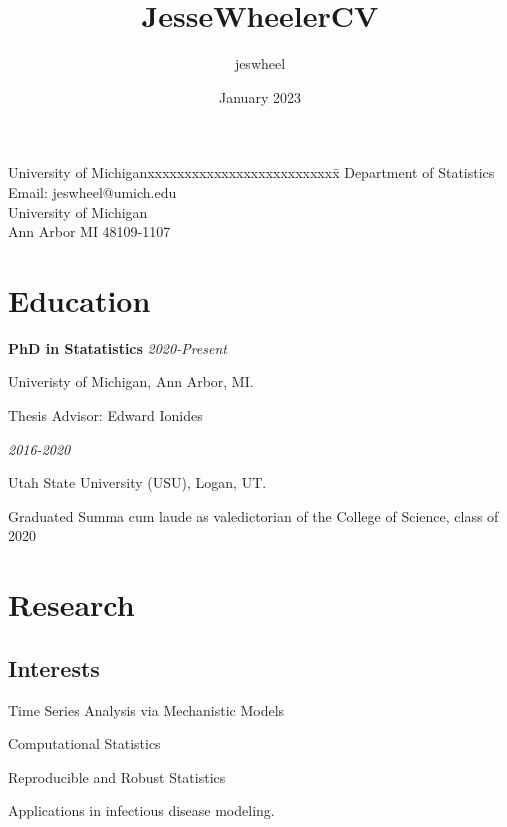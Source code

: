 \documentclass[11pt] {article}
\title{JesseWheelerCV}
\author{jeswheel }
\date{January 2023}
\newenvironment {interests}
                {
                 \begin{list}{}
                 {\setlength{\labelwidth}{0mm}
                  \setlength{\leftmargin}{8mm}
                  \setlength{\itemindent}{-3mm}
                  \setlength{\labelsep}{0mm}
                  \setlength{\parsep}{0.1 ex}
                  \setlength{\itemsep}{1pt}
      \setlength{\topsep}{0.15cm}}} %
   {\end{list}}
\begin{document}
\thispagestyle{empty}  %

\rule{0mm}{1mm}
\vspace{-20mm}


\vspace{1mm}

\rule{0mm}{1mm}


\begin{tabbing}
University of Michiganxxxxxxxxxxxxxxxxxxxxxxxxxx\= \kill
Department of Statistics \>  %
Email: {jeswheel@umich.edu}
\\
University of Michigan\> %
{}
\\
Ann Arbor MI 48109-1107 \> 
\end{tabbing}

\section*{Education}

{\bf PhD in Statatistics} \hfill {\textit{2020-Present}}

Univeristy of Michigan, Ann Arbor, MI.

Thesis Advisor: Edward Ionides

 \hfill  {\textit{2016-2020}}

Utah State University (USU), Logan, UT.

Graduated Summa cum laude as valedictorian of the College of Science, class of 2020

\section*{Research}
\subsection*{Interests} 
\begin{interests}
    \item Time Series Analysis via Mechanistic Models
    \item Computational Statistics 
    \item Reproducible and Robust Statistics 
    \item Applications in infectious disease modeling. 
\end{interests}
\end{document}
